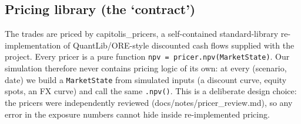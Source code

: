 \documentclass[11pt,letterpaper]{article}
\begin{document}
\subsection{Pricing library (the `contract')}
The trades are priced by capitolis\_pricers, a self-contained standard-library re-implementation of QuantLib/ORE-style discounted cash flows supplied with the project. Every pricer is a pure function \texttt{npv = pricer.npv(MarketState)}. Our simulation therefore never contains pricing logic of its own: at every (scenario, date) we build a \texttt{MarketState} from simulated inputs (a discount curve, equity spots, an FX curve) and call the same \texttt{.npv()}. This is a deliberate design choice: the pricers were independently reviewed (docs/notes/pricer\_review.md), so any error in the exposure numbers cannot hide inside re-implemented pricing.
\end{document}
